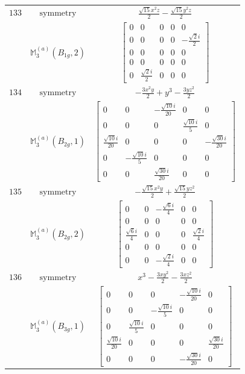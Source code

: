 \documentclass[fleqn,8pt,landscape]{jsarticle}
\begin{document}
\begin{longtable}{ccc}
$ 133 $ & $ \text{symmetry} $ & $ \frac{\sqrt{15} x^{2} z}{2} - \frac{\sqrt{15} y^{2} z}{2} $ \\
$  $ & $ \mathbb{M}_{3}^{(a)}(B_{1g},2) $ & $ \begin{bmatrix} 0 & 0 & 0 & 0 & 0 \\ 0 & 0 & 0 & 0 & - \frac{\sqrt{2} i}{2} \\ 0 & 0 & 0 & 0 & 0 \\ 0 & 0 & 0 & 0 & 0 \\ 0 & \frac{\sqrt{2} i}{2} & 0 & 0 & 0 \end{bmatrix} $ \\ \hline
$ 134 $ & $ \text{symmetry} $ & $ - \frac{3 x^{2} y}{2} + y^{3} - \frac{3 y z^{2}}{2} $ \\
$  $ & $ \mathbb{M}_{3}^{(a)}(B_{2g},1) $ & $ \begin{bmatrix} 0 & 0 & - \frac{\sqrt{10} i}{20} & 0 & 0 \\ 0 & 0 & 0 & \frac{\sqrt{10} i}{5} & 0 \\ \frac{\sqrt{10} i}{20} & 0 & 0 & 0 & - \frac{\sqrt{30} i}{20} \\ 0 & - \frac{\sqrt{10} i}{5} & 0 & 0 & 0 \\ 0 & 0 & \frac{\sqrt{30} i}{20} & 0 & 0 \end{bmatrix} $ \\ \hline
$ 135 $ & $ \text{symmetry} $ & $ - \frac{\sqrt{15} x^{2} y}{2} + \frac{\sqrt{15} y z^{2}}{2} $ \\
$  $ & $ \mathbb{M}_{3}^{(a)}(B_{2g},2) $ & $ \begin{bmatrix} 0 & 0 & - \frac{\sqrt{6} i}{4} & 0 & 0 \\ 0 & 0 & 0 & 0 & 0 \\ \frac{\sqrt{6} i}{4} & 0 & 0 & 0 & \frac{\sqrt{2} i}{4} \\ 0 & 0 & 0 & 0 & 0 \\ 0 & 0 & - \frac{\sqrt{2} i}{4} & 0 & 0 \end{bmatrix} $ \\ \hline
$ 136 $ & $ \text{symmetry} $ & $ x^{3} - \frac{3 x y^{2}}{2} - \frac{3 x z^{2}}{2} $ \\
$  $ & $ \mathbb{M}_{3}^{(a)}(B_{3g},1) $ & $ \begin{bmatrix} 0 & 0 & 0 & - \frac{\sqrt{10} i}{20} & 0 \\ 0 & 0 & - \frac{\sqrt{10} i}{5} & 0 & 0 \\ 0 & \frac{\sqrt{10} i}{5} & 0 & 0 & 0 \\ \frac{\sqrt{10} i}{20} & 0 & 0 & 0 & \frac{\sqrt{30} i}{20} \\ 0 & 0 & 0 & - \frac{\sqrt{30} i}{20} & 0 \end{bmatrix} $ \\ \hline

\end{longtable}
\end{document}
